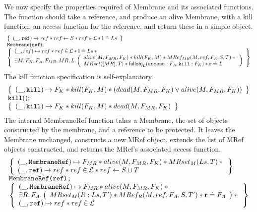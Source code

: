 \documentclass[a4paper,notitlepage]{report}
\begin{document}
We now specify the properties required of Membrane and its associated functions.
The  function should take a reference, and produce an alive
Membrane, with a kill function, an access function for the reference, and return
these in a simple object.
\[
  \begin{array}{l}
    \left\{ \begin{array}{l} 
      (\_, \mathtt{ref}) \mapsto ref \mathbin{*}
      ref \leftarrow S \mathbin{*}
      ref \mathbin{\dot\in} \mathcal{L} \mathbin{*}
      \textbf{l} \doteq Ls
     \end{array} \right\} \\
    \mathtt{Membrane(ref);} \\
    \left\{ \begin{array}{l} 
      (\_, ref) \mapsto ref \mathbin{*}
      ref \mathbin{\dot\in} \mathcal{L} \mathbin{*}
      \textbf{l} \doteq Ls \mathbin{*} {} \\
      \exists M, F_K, F_A, F_{MR}, MR, L \mathpunct{.} \left( \begin{array}{l} 
        alive(M, F_{MR}, F_K) \mathbin{*}
        kill(F_K,M) \mathbin{*}
        MRef_{MR}(M, ref, F_A, S, T) \mathbin{*} {} \\
        MRset([MR],T) \mathbin{*}
        \mathsf{fullobj}_L(\mathtt{access}:F_A,\mathtt{kill}:F_K) \mathbin{*}
        {\mathrm{\textbf{r}}} \doteq L
       \end{array} \right)
     \end{array} \right\}
  \end{array}
\]
The kill function specification is self-explanatory.
\[
  \begin{array}{l}
    \left\{ \begin{array}{l} 
      (\_,\mathtt{kill}) \mapsto F_K \mathbin{*} kill(F_K,M) \mathbin{*} (dead(M, F_{MR}, F_K)
      \lor alive(M, F_{MR}, F_K))
     \end{array} \right\} \\
    \mathtt{kill();} \\
    \left\{ \begin{array}{l} 
      (\_,\mathtt{kill}) \mapsto F_K \mathbin{*} kill(F_K,M) \mathbin{*} dead(M, F_{MR}, F_K)
     \end{array} \right\} \\
  \end{array}
\]
The internal MembraneRef function takes a Membrane, the set of objects
constructed by the membrane, and a reference to be protected. It leaves the
Membrane unchanged, constructs a new MRef object, extends the list of MRef
objects constructed, and returns the MRef's associated access function.
\[
  \begin{array}{l}
    \left\{ \begin{array}{l} 
      (\_,\mathtt{MembraneRef}) \mapsto F_{MR} \mathbin{*}
      alive(M, F_{MR}, F_K) \mathbin{*}
      MRset_M(Ls,T) \mathbin{*} {} \\
      (\_, \mathtt{ref}) \mapsto ref \mathbin{*}
      ref \mathbin{\dot\in} \mathcal{L} \mathbin{*}
      ref \leftarrow S \cup T
     \end{array} \right\} \\
    \texttt{MembraneRef(ref);} \\
    \left\{ \begin{array}{l} 
      (\_,\mathtt{MembraneRef}) \mapsto F_{MR} \mathbin{*}
      alive(M, F_{MR}, F_K) \mathbin{*} {} \\
      \exists R, F_A \mathpunct{.} \left( \begin{array}{l} 
        MRset_M(R:Ls,T') \mathbin{*}
        MRef_{R}(M,ref,F_A,S,T') \mathbin{*} {\mathrm{\textbf{r}}} \doteq F_A
       \end{array} \right) \mathbin{*} {} \\
      (\_, \mathtt{ref}) \mapsto ref \mathbin{*}
      ref \mathbin{\dot\in} \mathcal{L}
     \end{array} \right\} \\
  \end{array}
\]
\end{document}
